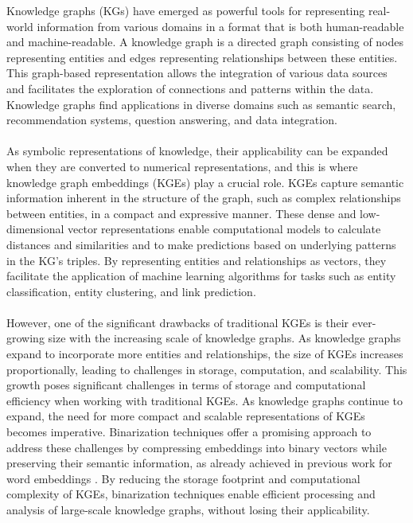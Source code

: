 \documentclass[11pt,titlepage,oneside,openany]{book}
\begin{document}
Knowledge graphs (KGs) have emerged as powerful tools for representing real-world information from various domains in a format that is both human-readable and machine-readable. A knowledge graph is a directed graph consisting of nodes representing entities and edges representing relationships between these entities. This graph-based representation allows the integration of various data sources and facilitates the exploration of connections and patterns within the data. Knowledge graphs find applications in diverse domains such as semantic search, recommendation systems, question answering, and data integration.\\
\\
As symbolic representations of knowledge, their applicability can be expanded when they are converted to numerical representations, and this is where knowledge graph embeddings (KGEs) play a crucial role. KGEs capture semantic information inherent in the structure of the graph, such as complex relationships between entities, in a compact and expressive manner. These dense and low-dimensional vector representations enable computational models to calculate distances and similarities and to make predictions based on underlying patterns in the KG's triples. By representing entities and relationships as vectors, they facilitate the application of machine learning algorithms for tasks such as entity classification, entity clustering, and link prediction. \\
\\
However, one of the significant drawbacks of traditional KGEs is their ever-growing size with the increasing scale of knowledge graphs. As knowledge graphs expand to incorporate more entities and relationships, the size of KGEs increases proportionally, leading to challenges in storage, computation, and scalability. This growth poses significant challenges in terms of storage and computational efficiency when working with traditional KGEs. As knowledge graphs continue to expand, the need for more compact and scalable representations of KGEs becomes imperative. Binarization techniques offer a promising approach to address these challenges by compressing embeddings into binary vectors while preserving their semantic information, as already achieved in previous work for word embeddings \cite{tissier_near-lossless_2019, navali_word_2020, pan_relation_2021}. By reducing the storage footprint and computational complexity of KGEs, binarization techniques enable efficient processing and analysis of large-scale knowledge graphs, without losing their applicability.
\end{document}
